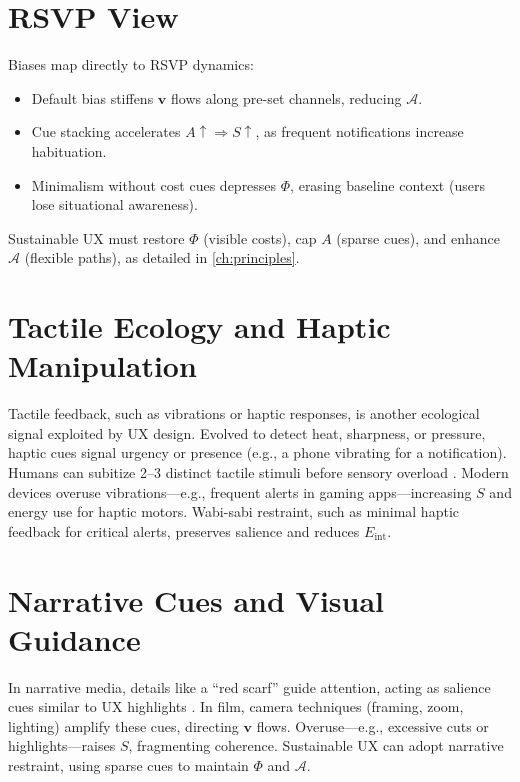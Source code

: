 \documentclass[openany]{book}
\newcommand{\PhiS}{\Phi} %
\newcommand{\vvec}{\mathbf{v}} %
\newcommand{\Sent}{S} %
\newcommand{\Eint}{E_{\mathrm{int}}} %
\newcommand{\Auton}{\mathcal{A}} %
\begin{document}
\section{RSVP View}
\label{sec:illusion-rsvp}
Biases map directly to RSVP dynamics:
\begin{itemize}
  \item Default bias stiffens $\vvec$ flows along pre-set channels, reducing $\Auton$.
  \item Cue stacking accelerates $A \uparrow \Rightarrow \Sent \uparrow$, as frequent notifications increase habituation.
  \item Minimalism without cost cues depresses $\PhiS$, erasing baseline context (users lose situational awareness).
\end{itemize}
Sustainable UX must restore $\PhiS$ (visible costs), cap $A$ (sparse cues), and enhance $\Auton$ (flexible paths), as detailed in \cref{ch:principles}.

\section{Tactile Ecology and Haptic Manipulation}
\label{sec:tactile}
Tactile feedback, such as vibrations or haptic responses, is another ecological signal exploited by UX design. Evolved to detect heat, sharpness, or pressure, haptic cues signal urgency or presence (e.g., a phone vibrating for a notification). Humans can subitize 2–3 distinct tactile stimuli before sensory overload \citep{gallace2006}. Modern devices overuse vibrations—e.g., frequent alerts in gaming apps—increasing $\Sent$ and energy use for haptic motors. Wabi-sabi restraint, such as minimal haptic feedback for critical alerts, preserves salience and reduces $\Eint$.

\section{Narrative Cues and Visual Guidance}
\label{sec:narrative}
In narrative media, details like a \enquote{red scarf} guide attention, acting as salience cues similar to UX highlights \citep{lewis1942}. In film, camera techniques (framing, zoom, lighting) amplify these cues, directing $\vvec$ flows. Overuse—e.g., excessive cuts or highlights—raises $\Sent$, fragmenting coherence. Sustainable UX can adopt narrative restraint, using sparse cues to maintain $\PhiS$ and $\Auton$.
\end{document}
